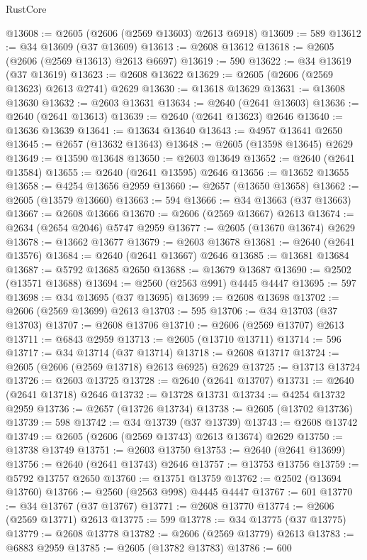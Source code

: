 \begin{lexlean}{RustCore}
\begin{coremodule}
@13608 := @2605 (@2606 (@2569 @13603) @2613 @6918)
@13609 := 589
@13612 := @34 @13609 (@37 @13609)
@13613 := @2608 @13612
@13618 := @2605 (@2606 (@2569 @13613) @2613 @6697)
@13619 := 590
@13622 := @34 @13619 (@37 @13619)
@13623 := @2608 @13622
@13629 := @2605 (@2606 (@2569 @13623) @2613 @2741) @2629
@13630 := @13618 @13629
@13631 := @13608 @13630
@13632 := @2603 @13631
@13634 := @2640 (@2641 @13603)
@13636 := @2640 (@2641 @13613)
@13639 := @2640 (@2641 @13623) @2646
@13640 := @13636 @13639
@13641 := @13634 @13640
@13643 := @4957 @13641 @2650
@13645 := @2657 (@13632 @13643)
@13648 := @2605 (@13598 @13645) @2629
@13649 := @13590 @13648
@13650 := @2603 @13649
@13652 := @2640 (@2641 @13584)
@13655 := @2640 (@2641 @13595) @2646
@13656 := @13652 @13655
@13658 := @4254 @13656 @2959
@13660 := @2657 (@13650 @13658)
@13662 := @2605 (@13579 @13660)
@13663 := 594
@13666 := @34 @13663 (@37 @13663)
@13667 := @2608 @13666
@13670 := @2606 (@2569 @13667) @2613
@13674 := @2634 (@2654 @2046) @5747 @2959
@13677 := @2605 (@13670 @13674) @2629
@13678 := @13662 @13677
@13679 := @2603 @13678
@13681 := @2640 (@2641 @13576)
@13684 := @2640 (@2641 @13667) @2646
@13685 := @13681 @13684
@13687 := @5792 @13685 @2650
@13688 := @13679 @13687
@13690 := @2502 (@13571 @13688)
@13694 := @2560 (@2563 @991) @4445 @4447
@13695 := 597
@13698 := @34 @13695 (@37 @13695)
@13699 := @2608 @13698
@13702 := @2606 (@2569 @13699) @2613
@13703 := 595
@13706 := @34 @13703 (@37 @13703)
@13707 := @2608 @13706
@13710 := @2606 (@2569 @13707) @2613
@13711 := @6843 @2959
@13713 := @2605 (@13710 @13711)
@13714 := 596
@13717 := @34 @13714 (@37 @13714)
@13718 := @2608 @13717
@13724 := @2605 (@2606 (@2569 @13718) @2613 @6925) @2629
@13725 := @13713 @13724
@13726 := @2603 @13725
@13728 := @2640 (@2641 @13707)
@13731 := @2640 (@2641 @13718) @2646
@13732 := @13728 @13731
@13734 := @4254 @13732 @2959
@13736 := @2657 (@13726 @13734)
@13738 := @2605 (@13702 @13736)
@13739 := 598
@13742 := @34 @13739 (@37 @13739)
@13743 := @2608 @13742
@13749 := @2605 (@2606 (@2569 @13743) @2613 @13674) @2629
@13750 := @13738 @13749
@13751 := @2603 @13750
@13753 := @2640 (@2641 @13699)
@13756 := @2640 (@2641 @13743) @2646
@13757 := @13753 @13756
@13759 := @5792 @13757 @2650
@13760 := @13751 @13759
@13762 := @2502 (@13694 @13760)
@13766 := @2560 (@2563 @998) @4445 @4447
@13767 := 601
@13770 := @34 @13767 (@37 @13767)
@13771 := @2608 @13770
@13774 := @2606 (@2569 @13771) @2613
@13775 := 599
@13778 := @34 @13775 (@37 @13775)
@13779 := @2608 @13778
@13782 := @2606 (@2569 @13779) @2613
@13783 := @6883 @2959
@13785 := @2605 (@13782 @13783)
@13786 := 600

\end{coremodule}
\end{lexlean}

